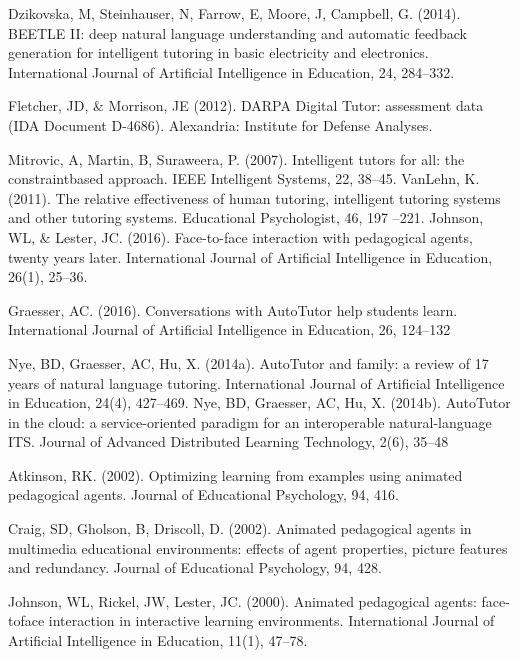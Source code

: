 \documentclass[letterpaper%
, twoside%
, 12pt%
,these%
, english%
,creativecommons,hyperref, withAlgo2e %
]{thETS}
\begin{document}
\begin{thebibliography}{01}
		
		
		
		Dzikovska, M, Steinhauser, N, Farrow, E, Moore, J, Campbell, G. (2014). BEETLE II:
		deep natural language understanding and automatic feedback generation
		for intelligent tutoring in basic electricity and electronics. International
		Journal of Artificial Intelligence in Education, 24, 284–332.
		
	Fletcher, JD, \& Morrison, JE (2012). DARPA Digital Tutor: assessment data (IDA
Document D-4686). Alexandria: Institute for Defense Analyses.		
		
		
		
		Mitrovic, A, Martin, B, Suraweera, P. (2007). Intelligent tutors for all: the constraintbased approach. IEEE Intelligent Systems, 22, 38–45.
		VanLehn, K. (2011). The relative effectiveness of human tutoring, intelligent tutoring
		systems and other tutoring systems. Educational Psychologist, 46, 197
		–221.
	Johnson, WL, \& Lester, JC. (2016). Face-to-face interaction with pedagogical
	agents, twenty years later. International Journal of Artificial Intelligence in
	Education, 26(1), 25–36.	
		
	Graesser, AC. (2016). Conversations with AutoTutor help students learn.
	International Journal of Artificial Intelligence in Education, 26, 124–132	
		
		Nye, BD, Graesser, AC, Hu, X. (2014a). AutoTutor and family: a review of 17 years
		of natural language tutoring. International Journal of Artificial Intelligence in
		Education, 24(4), 427–469.
		Nye, BD, Graesser, AC, Hu, X. (2014b). AutoTutor in the cloud: a service-oriented
		paradigm for an interoperable natural-language ITS. Journal of Advanced
		Distributed Learning Technology, 2(6), 35–48
		
		
		
		
			Atkinson, RK. (2002). Optimizing learning from examples using animated
		pedagogical agents. Journal of Educational Psychology, 94, 416.
		
				Craig, SD, Gholson, B, Driscoll, D. (2002). Animated pedagogical agents in
		multimedia educational environments: effects of agent properties, picture
		features and redundancy. Journal of Educational Psychology, 94, 428.
		
		
			Johnson, WL, Rickel, JW, Lester, JC. (2000). Animated pedagogical agents: face-toface interaction in interactive learning environments. International Journal of
		Artificial Intelligence in Education, 11(1), 47–78.
		

\end{thebibliography}
\end{document}
